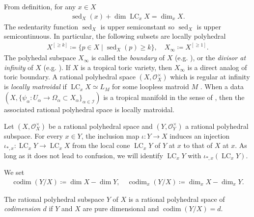 \documentclass[a4paper,dvipdfmx,reqno,12pt]{amsart}
\theoremstyle{definition}
\newcommand{\deq}{\coloneqq}
\newcommand{\opn}[1]{\operatorname{#1}}
\numberwithin{equation}{section}
\begin{document}
From definition, for any $x\in X$
\begin{align}
\opn{sed}_X(x)+\dim \opn{LC}_x X=\dim_x X.
\end{align}
The sedentarity function
$\opn{sed}_X$ is upper semiconstant
\cite[Definition 7.1.11]{mikhalkin2018tropical} so 
$\opn{sed}_X$ is upper semicontinuous.
In particular, the following subsets are
locally polyhedral \cite[Proposition 7.1.12]{mikhalkin2018tropical} 
\begin{align}
X^{[\geq k]}\deq \{p\in X\mid \opn{sed}_X(p)\geq k\},
\quad 
X_{\infty}\deq X^{[\geq 1]}.
\end{align}
The polyhedal subspace $X_{\infty}$ is called
the \emph{boundary} of $X$ (e.g. \cite{demedrano2023chern}),
or the \emph{divisor at infinity} of $X$
(e.g. \cite[Definition 7.2.9]{mikhalkin2018tropical}).
If $X$ is a
tropical toric variety, then $X_{\infty}$ is a
direct analog of toric boundary.
A rational polyhedral space $(X,\mathcal{O}_X^{\times})$
which is regular at infinity is \emph{locally matroidal}
if $\opn{LC}_x X\simeq L_M$ for some loopless matroid $M$
\cite[]{MR4637248}. When a data
$(X,\{\psi_\alpha \colon U_{\alpha} \to 
\Omega_{\alpha}\subset X_{\alpha}\}_{\alpha \in \mathcal{I}})$
is a tropical manifold in the sense of 
\cite[Definition 2.3]{demedrano2023chern},
then the associated rational polyhedral space
is locally matroidal.

Let $(X,\mathcal{O}_X^{\times})$ be a rational
polyhedral space and $(Y,\mathcal{O}_Y^{\times})$
a rational polyhedral subspace.
For every $x\in Y$, 
the inclusion map $\iota\colon Y\to X$ induces
an injection 
$\iota_{*,x}\colon \opn{LC}_x Y\to \opn{LC}_x X$
from the local cone $\opn{LC}_x Y$ of $Y$ at $x$ to 
that of $X$ at $x$.
As long as it does not lead to confusion, we will identify
$\opn{LC}_x Y$ with $\iota_{*,x}(\opn{LC}_x Y)$.

We set 
\begin{align}
\opn{codim}(Y/X)\deq \dim X -\dim Y,\quad 
\opn{codim}_x(Y/X)\deq \dim_x X -\dim_x Y.
\end{align}

The rational polyhedral subspace $Y$ of $X$ is
a rational polyhedral space of
\emph{codimension $d$} if $Y$ and $X$ are pure dimensional
and $\opn{codim}(Y/X)=d$.
\end{document}
